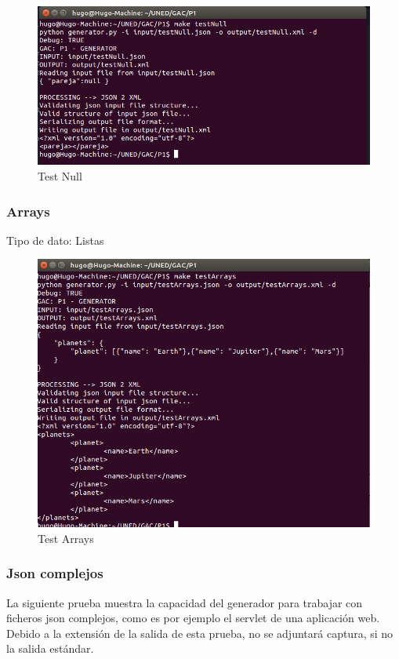 \documentclass[a4paper,11pt]{book}
\begin{document}
\begin{figure}[H]  
\centering 
\includegraphics[scale=0.35]{imagenes/testNull.png}
\caption{ Test Null  }  
\end{figure} 

\subsubsection{Arrays}
Tipo de dato: Listas

\begin{figure}[H]  
\centering 
\includegraphics[scale=0.35]{imagenes/testArrays.png}
\caption{ Test Arrays  }  
\end{figure} 

\subsubsection{Json complejos}
La siguiente prueba muestra la capacidad del generador para trabajar con ficheros json complejos, como es por ejemplo el servlet de una aplicación web. Debido a la extensión de la salida de esta prueba, no se adjuntará captura, si no la salida estándar. 
 
\end{document}
